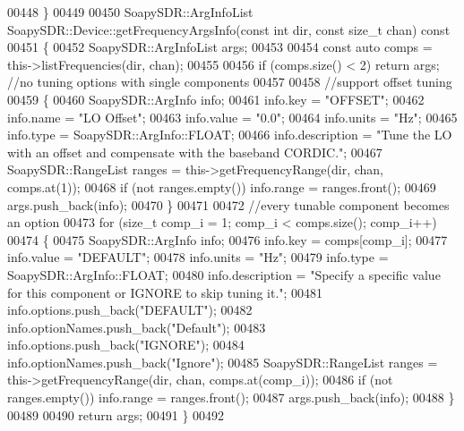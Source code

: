 \begin{DoxyCode}
00448 \}
00449 
00450 SoapySDR::ArgInfoList SoapySDR::Device::getFrequencyArgsInfo(\textcolor{keyword}{const} \textcolor{keywordtype}{int} dir, \textcolor{keyword}{const} \textcolor{keywordtype}{size\_t} 
      chan)\textcolor{keyword}{ const}
00451 \textcolor{keyword}{}\{
00452     SoapySDR::ArgInfoList args;
00453 
00454     \textcolor{keyword}{const} \textcolor{keyword}{auto} comps = this->listFrequencies(dir, chan);
00455 
00456     \textcolor{keywordflow}{if} (comps.size() < 2) \textcolor{keywordflow}{return} args; \textcolor{comment}{//no tuning options with single components}
00457 
00458     \textcolor{comment}{//support offset tuning}
00459     \{
00460         SoapySDR::ArgInfo info;
00461         info.key = \textcolor{stringliteral}{"OFFSET"};
00462         info.name = \textcolor{stringliteral}{"LO Offset"};
00463         info.value = \textcolor{stringliteral}{"0.0"};
00464         info.units = \textcolor{stringliteral}{"Hz"};
00465         info.type = SoapySDR::ArgInfo::FLOAT;
00466         info.description = \textcolor{stringliteral}{"Tune the LO with an offset and compensate with the baseband CORDIC."};
00467         SoapySDR::RangeList ranges = this->getFrequencyRange(dir, chan, comps.at(1));
00468         \textcolor{keywordflow}{if} (not ranges.empty()) info.range = ranges.front();
00469         args.push\_back(info);
00470     \}
00471 
00472     \textcolor{comment}{//every tunable component becomes an option}
00473     \textcolor{keywordflow}{for} (\textcolor{keywordtype}{size\_t} comp\_i = 1; comp\_i < comps.size(); comp\_i++)
00474     \{
00475         SoapySDR::ArgInfo info;
00476         info.key = comps[comp\_i];
00477         info.value = \textcolor{stringliteral}{"DEFAULT"};
00478         info.units = \textcolor{stringliteral}{"Hz"};
00479         info.type = SoapySDR::ArgInfo::FLOAT;
00480         info.description = \textcolor{stringliteral}{"Specify a specific value for this component or IGNORE to skip tuning it."};
00481         info.options.push\_back(\textcolor{stringliteral}{"DEFAULT"});
00482         info.optionNames.push\_back(\textcolor{stringliteral}{"Default"});
00483         info.options.push\_back(\textcolor{stringliteral}{"IGNORE"});
00484         info.optionNames.push\_back(\textcolor{stringliteral}{"Ignore"});
00485         SoapySDR::RangeList ranges = this->getFrequencyRange(dir, chan, comps.at(comp\_i));
00486         \textcolor{keywordflow}{if} (not ranges.empty()) info.range = ranges.front();
00487         args.push\_back(info);
00488     \}
00489 
00490     \textcolor{keywordflow}{return} args;
00491 \}
00492 

\end{DoxyCode}
